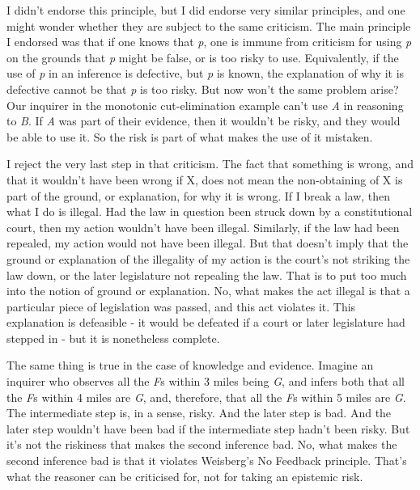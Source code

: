 \documentclass[
  11pt,
]{book}
\begin{document}
I didn't endorse this principle, but I did endorse very similar principles, and one might wonder whether they are subject to the same criticism. The main principle I endorsed was that if one knows that \emph{p}, one is immune from criticism for using \emph{p} on the grounds that \emph{p} might be false, or is too risky to use. Equivalently, if the use of \emph{p} in an inference is defective, but \emph{p} is known, the explanation of why it is defective cannot be that \emph{p} is too risky. But now won't the same problem arise? Our inquirer in the monotonic cut-elimination example can't use \emph{A} in reasoning to \emph{B}. If \emph{A} was part of their evidence, then it wouldn't be risky, and they would be able to use it. So the risk is part of what makes the use of it mistaken.

I reject the very last step in that criticism. The fact that something is wrong, and that it wouldn't have been wrong if X, does not mean the non-obtaining of X is part of the ground, or explanation, for why it is wrong. If I break a law, then what I do is illegal. Had the law in question been struck down by a constitutional court, then my action wouldn't have been illegal. Similarly, if the law had been repealed, my action would not have been illegal. But that doesn't imply that the ground or explanation of the illegality of my action is the court's not striking the law down, or the later legislature not repealing the law. That is to put too much into the notion of ground or explanation. No, what makes the act illegal is that a particular piece of legislation was passed, and this act violates it. This explanation is defeasible - it would be defeated if a court or later legislature had stepped in - but it is nonetheless complete.

The same thing is true in the case of knowledge and evidence. Imagine an inquirer who observes all the \emph{F}s within 3 miles being \emph{G}, and infers both that all the \emph{F}s within 4 miles are \emph{G}, and, therefore, that all the \emph{F}s within 5 miles are \emph{G}. The intermediate step is, in a sense, risky. And the later step is bad. And the later step wouldn't have been bad if the intermediate step hadn't been risky. But it's not the riskiness that makes the second inference bad. No, what makes the second inference bad is that it violates Weisberg's No Feedback principle. That's what the reasoner can be criticised for, not for taking an epistemic risk.
\end{document}
